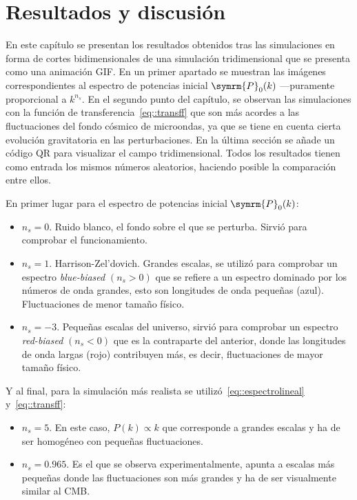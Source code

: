 \chapter{Resultados y discusión}
En este capítulo se presentan los resultados obtenidos tras las simulaciones en forma de cortes bidimensionales de una simulación tridimensional que se presenta como una animación GIF. En un primer apartado se muestran las imágenes correspondientes al espectro de potencias inicial \(\symrm{P}_0(k)\) ---puramente proporcional a \(k^{n_s}\). En el segundo punto del capítulo, se observan las simulaciones con la función de transferencia~\eqref{eq::transff} que son más acordes a las fluctuaciones del fondo cósmico de microondas, ya que se tiene en cuenta cierta evolución gravitatoria en las perturbaciones. En la última sección se añade un código QR para visualizar el campo tridimensional. Todos los resultados tienen como entrada los mismos números aleatorios, haciendo posible la comparación entre ellos.\the\textheight \the\textwidth

En primer lugar para el espectro de potencias inicial \(\symrm{P}_0(k)\):
\begin{itemize}
    \item \(n_s=0\). Ruido blanco, el fondo sobre el que se perturba. Sirvió para comprobar el funcionamiento.
    \item \(n_s=1\). Harrison-Zel'dovich. Grandes escalas, se utilizó para comprobar un espectro \textit{blue-biased} \((n_s>0)\) que se refiere a un espectro dominado por los números de onda grandes, esto son longitudes de onda pequeñas (azul). Fluctuaciones de menor tamaño físico.
    \item \(n_s=-3\). Pequeñas escalas del universo, sirvió para comprobar un espectro \textit{red-biased} \((n_s<0)\) que es la contraparte del anterior, donde las longitudes de onda largas (rojo) contribuyen más, es decir, fluctuaciones de mayor tamaño físico.
\end{itemize}
Y al final, para la simulación más realista se utilizó~\eqref{eq::espectrolineal} y~\eqref{eq::transff}:
\begin{itemize}
    \item \(n_s=5\). En este caso, \(P(k)\propto k\) que corresponde a grandes escalas y ha de ser homogéneo con pequeñas fluctuaciones.
    \item \(n_s=0.965\). Es el que se observa experimentalmente, apunta a escalas más pequeñas donde las fluctuaciones son más grandes y ha de ser visualmente similar al CMB.
\end{itemize}

